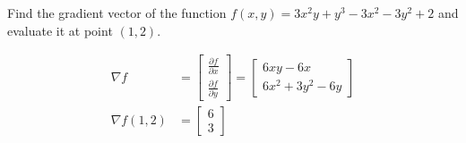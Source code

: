 Find the gradient vector of the function $f(x, y) = 3x^2y + y^3 - 3x^2 - 3y^2 + 2$ and evaluate it at point $(1, 2)$.

\begin{solution}
\begin{align*}
    \nabla f &= \begin{bmatrix}
        \frac{\partial f}{\partial x} \\
        \frac{\partial f}{\partial y}
    \end{bmatrix} = \begin{bmatrix}
        6xy-6x \\
        6x^2 + 3y^2 - 6y
    \end{bmatrix} \\
    \nabla f(1, 2) &= \begin{bmatrix}
        6 \\ 3
    \end{bmatrix}
\end{align*}
\end{solution}